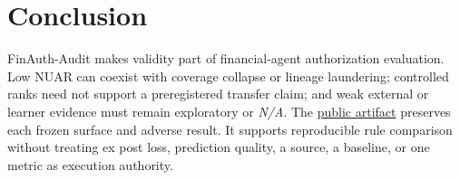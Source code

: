 \section{Conclusion}
FinAuth-Audit makes validity part of financial-agent authorization evaluation. Low NUAR can coexist with coverage collapse or lineage laundering; controlled ranks need not support a preregistered transfer claim; and weak external or learner evidence must remain exploratory or \textit{N/A}. The \href{https://github.com/colin-wang-research/finanth-audit}{public artifact} preserves each frozen surface and adverse result. It supports reproducible rule comparison without treating ex post loss, prediction quality, a source, a baseline, or one metric as execution authority.
